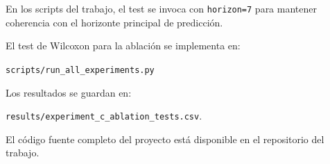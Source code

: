 En los scripts del trabajo, el test se invoca con \texttt{horizon=7} para mantener coherencia con el horizonte principal de predicción.

El test de Wilcoxon para la ablación se implementa en:

\noindent\texttt{scripts/run\_all\_experiments.py}

Los resultados se guardan en:

\noindent\texttt{results/experiment\_c\_ablation\_tests.csv}.

El código fuente completo del proyecto está disponible en el repositorio del trabajo.
